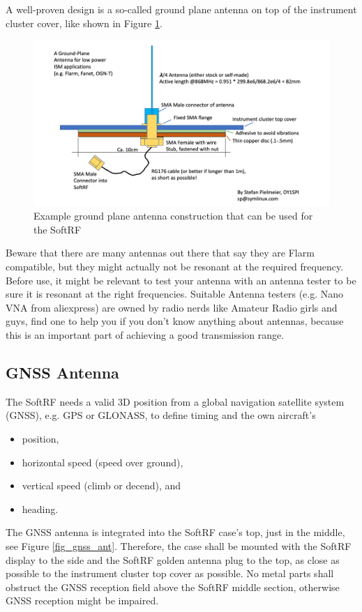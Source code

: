 \documentclass[10pt,a4paper]{article}
\begin{document}
A well-proven design is a so-called ground plane antenna on top of the instrument cluster cover, like shown in Figure \ref{groundplane}.

\begin{figure}[h]
\includegraphics[scale=.5]{gp-antenna.png}
\caption{Example ground plane antenna construction that can be used for the SoftRF}\label{groundplane}
\end{figure}\FloatBarrier

Beware that there are many antennas out there that say they are Flarm compatible, but they might actually not be resonant at the required frequency. Before use, it might be relevant to test your antenna with an antenna tester to be sure it is resonant at the right frequencies. Suitable Antenna testers (e.g. Nano VNA from aliexpress) are owned by radio nerds like Amateur Radio girls and guys, find one to help you if you don't know anything about antennas, because this is an important part of achieving a good transmission range.

\subsection{GNSS Antenna}
The SoftRF needs a valid 3D position from a global navigation satellite system (GNSS), e.g. GPS or GLONASS, to define timing and the own aircraft's

\begin{itemize}
\item position,
\item horizontal speed (speed over ground),
\item vertical speed (climb or decend), and
\item heading.
\end{itemize}

The GNSS antenna is integrated into the SoftRF case's top, just in the middle, see Figure \ref{fig_gnss_ant}. Therefore, the case shall be mounted with the SoftRF display to the side and the SoftRF golden antenna plug to the top, as close as possible to the instrument cluster top cover as possible. No metal parts shall obstruct the GNSS reception field above the SoftRF middle section, otherwise GNSS reception might be impaired. 
\end{document}

